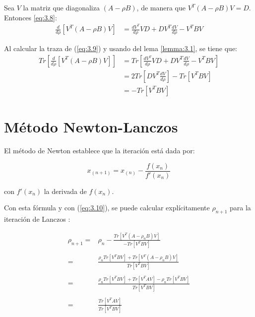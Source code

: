 Sea $V$ la matriz que diagonaliza $(A-\rho B)$, de manera que $V^T (A-\rho B) V = D$. Entonces \ref{eq:3.8}:
\begin{equation}\label{eq:3.9}
\begin{aligned}
\frac{d}{d\rho}\left[V^T (A-\rho B)V \right] & = \frac{dV^T}{d\rho} VD  + DV^T\frac{dV}{d\rho} - V^TBV 
\end{aligned}
\end{equation}

Al calcular la traza de (\ref{eq:3.9}) y usando del lema \ref{lemma:3.1}, se tiene que:
\begin{equation}\label{eq:3.10}
\begin{aligned}
Tr\left[\frac{d}{d\rho} \left[V^T (A-\rho B)V \right]\right] & = Tr\left[ \frac{dV^T}{d\rho} VD + DV^T \frac{dV}{d\rho} - V^T B V  \right] \\
											     & = 2 Tr \left[ D V^T \frac{dV}{d\rho} \right] - Tr \left[ V^T B V \right] \\
											     & = -Tr\left[V^T B V \right] 
\end{aligned}	
\end{equation}

\section{Método Newton-Lanczos}

El método de Newton establece que la iteración está dada por:

\begin{equation*}
x_{(n+1)} = x_{(n)} - \frac{f(x_n)}{f'(x_n)}
\end{equation*}

con $f'(x_n)$ la derivada de $f(x_n)$.

Con esta fórmula y con (\ref{eq:3.10}), se puede calcular explícitamente $\rho_{n+1}$ para la iteración de Lanczos \cite{ngo2012trace}:

\begin{equation}\label{eq:3.11}
\begin{aligned}
\rho_{n+1} =& \rho_{n} - \frac{Tr\left[V^T (A-\rho_n B)V \right]}{-Tr\left[V^T B V \right]} \\ \\
           =& \frac{\rho_{n} Tr\left[V^T B V \right] +  Tr\left[V^T (A-\rho_n B)V \right]}{Tr\left[V^T B V \right]}\\ \\
           =& \frac{\rho_{n} Tr\left[V^T B V \right] +  Tr\left[V^T A V \right] - \rho_nTr\left[V^T BV \right]}{Tr\left[V^T B V \right]} \\ \\
           =&\frac{Tr\left[V^T A V \right]}{Tr\left[V^T B V \right]}
\end{aligned} 
\end{equation}

